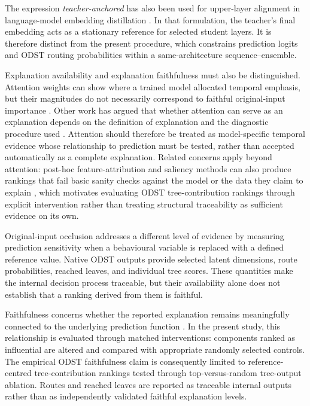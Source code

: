 \smallskip
The expression \emph{teacher-anchored} has also been used for upper-layer
alignment in language-model embedding distillation
\cite{Dao2026TALAS}. In that formulation, the teacher's final embedding
acts as a stationary reference for selected student layers. It is therefore
distinct from the present procedure, which constrains prediction logits and
ODST routing probabilities within a same-architecture
sequence--ensemble.

\smallskip
Explanation availability and explanation faithfulness must also be
distinguished. Attention weights can show where a trained model allocated
temporal emphasis, but their magnitudes do not necessarily correspond to
faithful original-input importance
\cite{JainWallace2019Attention,SerranoSmith2019Attention}. Other work has
argued that whether attention can serve as an explanation depends on the
definition of explanation and the diagnostic procedure used
\cite{WiegreffePinter2019Attention}. Attention should therefore be treated
as model-specific temporal evidence whose relationship to prediction must
be tested, rather than accepted automatically as a complete explanation.
Related concerns apply beyond attention: post-hoc feature-attribution and
saliency methods can also produce rankings that fail basic sanity checks
against the model or the data they claim to explain
\cite{Adebayo2018SanityChecks}, which motivates evaluating ODST
tree-contribution rankings through explicit intervention rather than
treating structural traceability as sufficient evidence on its own.

\smallskip
Original-input occlusion addresses a different level of evidence by
measuring prediction sensitivity when a behavioural variable is replaced
with a defined reference value. Native ODST outputs provide selected latent
dimensions, route probabilities, reached leaves, and individual tree
scores. These quantities make the internal decision process traceable, but
their availability alone does not establish that a ranking derived from
them is faithful.

\smallskip
Faithfulness concerns whether the reported explanation remains meaningfully
connected to the underlying prediction function
\cite{Dasgupta2022Faithfulness}. In the present study, this relationship is
evaluated through matched interventions: components ranked as influential
are altered and compared with appropriate randomly selected controls. The
empirical ODST faithfulness claim is consequently limited to
reference-centred tree-contribution rankings tested through
top-versus-random tree-output ablation. Routes and reached leaves are
reported as traceable internal outputs rather than as independently
validated faithful explanation levels.
